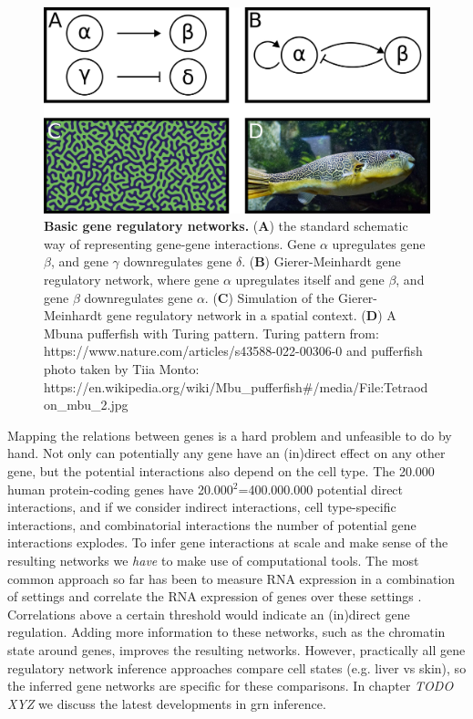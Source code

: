 \begin{figure}[H]
    \includegraphics[width=\linewidth]{ch.introduction/imgs/network.png}
    \caption{\textbf{Basic gene regulatory networks.} (\textbf{A}) the standard schematic way of representing gene-gene interactions. Gene $\alpha$ upregulates gene $\beta$, and gene $\gamma$ downregulates gene $\delta$. (\textbf{B}) Gierer-Meinhardt gene regulatory network, where gene $\alpha$ upregulates itself and gene $\beta$, and gene $\beta$ downregulates gene $\alpha$. (\textbf{C}) Simulation of the Gierer-Meinhardt gene regulatory network in a spatial context. (\textbf{D}) A Mbuna pufferfish with Turing pattern. Turing pattern from: https://www.nature.com/articles/s43588-022-00306-0 and pufferfish photo taken by Tiia Monto: https://en.wikipedia.org/wiki/Mbu\_pufferfish\#/media/File:Tetraodon\_mbu\_2.jpg}
    \label{fig:network}
\end{figure}

Mapping the relations between genes is a hard problem and unfeasible to do by hand. Not only can potentially any gene have an (in)direct effect on any other gene, but the potential interactions also depend on the cell type. The 20.000 human protein-coding genes have 20.000$^2$=400.000.000 potential direct interactions, and if we consider indirect interactions, cell type-specific interactions, and combinatorial interactions the number of potential gene interactions explodes. To infer gene interactions at scale and make sense of the resulting networks we \textit{have} to make use of computational tools. The most common approach so far has been to measure RNA expression in a combination of settings and correlate the RNA expression of genes over these settings \cite{Zhang_2005,Margolin_2006}. Correlations above a certain threshold would indicate an (in)direct gene regulation. Adding more information to these networks, such as the chromatin state around genes\cite{Xu_2020,Kamal_2021}, improves the resulting networks. However, practically all gene regulatory network inference approaches compare cell states (e.g. liver vs skin), so the inferred gene networks are specific for these comparisons. In chapter \textit{TODO XYZ} we discuss the latest developments in grn inference.

